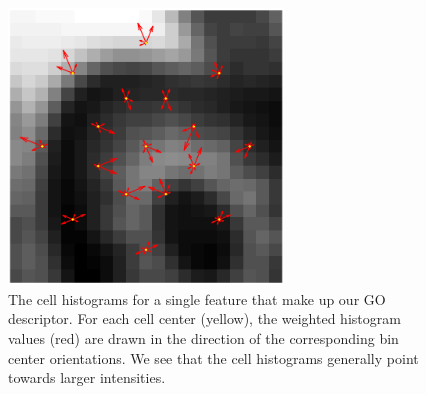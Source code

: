 \documentclass[thesis.tex]{subfiles}
\begin{document}
\begin{figure}[tb]
    \centering
    \includegraphics[width=0.65\textwidth]{img/cellHistFigureGo.pdf}
    \caption{The cell histograms for a single feature that make up our GO descriptor. For each cell center (yellow), the weighted histogram values (red) are drawn in the direction of the corresponding bin center orientations. We see that the cell histograms generally point towards larger intensities.}
    \label{fig:cellHistFigureGoM}
\end{figure}
\end{document}
